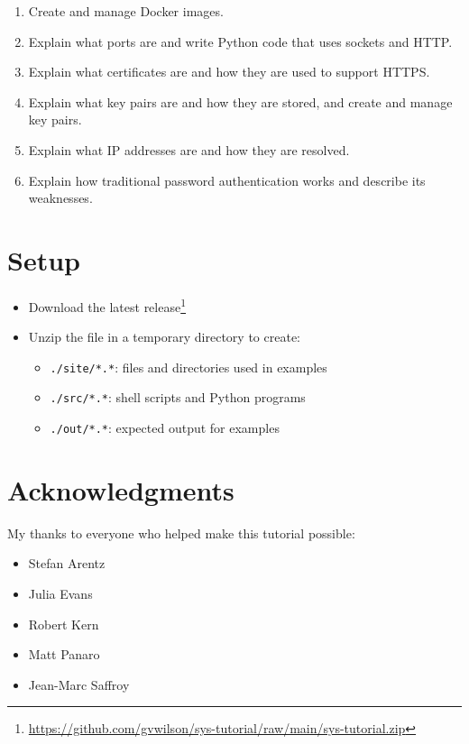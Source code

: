\documentclass[krantzl]{krantz}
\newcommand{\hreffoot}[2]{{#1}\footnote{\href{#2}{#2}}}
\begin{document}
\begin{itemize}
\begin{enumerate}
\item Create and manage Docker images.

\item Explain what ports are and write Python code that uses sockets and HTTP.

\item Explain what certificates are and how they are used to support HTTPS.

\item Explain what key pairs are and how they are stored, and create and manage key pairs.

\item Explain what IP addresses are and how they are resolved.

\item Explain how traditional password authentication works and describe its weaknesses.

\end{enumerate}


\end{itemize}
\section{Setup}
\begin{itemize}
\item Download \hreffoot{the latest release}{https://github.com/gvwilson/sys-tutorial/raw/main/sys-tutorial.zip}

\item Unzip the file in a temporary directory to create:\begin{itemize}
\item \texttt{./site/*.*}: files and directories used in examples

\item \texttt{./src/*.*}: shell scripts and Python programs

\item \texttt{./out/*.*}: expected output for examples

\end{itemize}


\end{itemize}
\section{Acknowledgments}

My thanks to everyone who helped make this tutorial possible:

\begin{itemize}\item Stefan Arentz

\item Julia Evans

\item Robert Kern

\item Matt Panaro

\item Jean-Marc Saffroy
\end{itemize}
\end{document}
